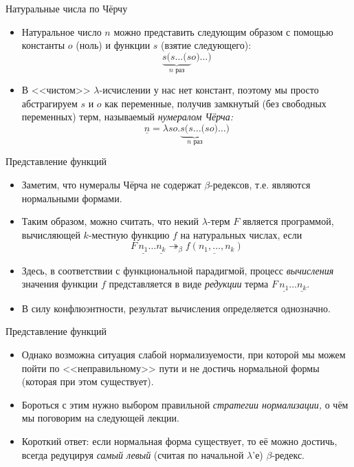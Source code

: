 \documentclass[xcolor=dvipsnames]{beamer}
\begin{document}
\begin{frame}{Натуральные числа по Чёрчу}

\begin{itemize}[<+->]
 \item Натуральное число $n$ можно представить следующим образом с помощью константы $o$ (ноль) и функции $s$ (взятие следующего):
 \[
  \underbrace{s(s \ldots (s}_{\text{$n$ раз}}
  o) \ldots)
 \]

 \item В <<чистом>> $\lambda$-исчислении у нас нет констант, поэтому мы просто абстрагируем $s$ и $o$ как переменные, получив замкнутый (без свободных переменных) терм, называемый {\em нумералом Чёрча:}
 \[
  \underline{n} = \lambda s o. \underbrace{s(s \ldots (s}_{\text{$n$ раз}}
  o) \ldots)
 \]

\end{itemize}

 
\end{frame}

\begin{frame}{Представление функций}

\begin{itemize}[<+->]
 \item Заметим, что нумералы Чёрча не содержат $\beta$-редексов, т.е. являются нормальными формами.
 
 \item Таким образом, можно считать, что некий $\lambda$-терм $F$ является программой, вычисляющей $k$-местную функцию $f$ на натуральных числах, если 
 \[F \, \underline{n_1} \ldots \underline{n_k}
 \twoheadrightarrow_\beta 
 \underline{f(n_1, \ldots, n_k)}\]
 
 \item Здесь, в соответствии с функциональной парадигмой, процесс {\em вычисления} значения функции $f$ представляется в виде {\em редукции} терма $F \, \underline{n_1} \ldots \underline{n_k}$.
 
 \item В силу конфлюэнтности, результат вычисления определяется однозначно.
\end{itemize}

 
\end{frame}

\begin{frame}{Представление функций}

\begin{itemize}[<+->]
 \item Однако возможна ситуация слабой нормализуемости, при которой мы можем пойти по <<неправильному>> пути и не достичь нормальной формы (которая при этом существует).
 
 \item Бороться с этим нужно выбором правильной {\em стратегии нормализации,} о чём мы поговорим на следующей лекции.
 
 \item Короткий ответ: если нормальная форма существует, то её можно достичь, всегда редуцируя {\em самый левый} (считая по начальной $\lambda$'е) $\beta$-редекс.
\end{itemize}


\end{frame}
\end{document}

